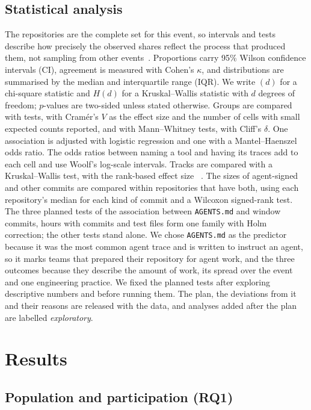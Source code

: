 \documentclass{article}
\begin{document}
\subsection{Statistical analysis}
The repositories are the complete set for this event, so intervals and tests describe how precisely the observed shares reflect the process that produced them, not sampling from other events~\cite{baltes2022sampling}. Proportions carry 95\% Wilson confidence intervals (CI), agreement is measured with Cohen's $\kappa$, and distributions are summarised by the median and interquartile range (IQR). We write \chisq$(d)$ for a chi-square statistic and $H(d)$ for a Kruskal--Wallis statistic with $d$ degrees of freedom; $p$-values are two-sided unless stated otherwise. Groups are compared with \chisq{} tests, with Cramér's $V$ as the effect size and the number of cells with small expected counts reported, and with Mann--Whitney tests, with Cliff's $\delta$. One association is adjusted with logistic regression and one with a Mantel--Haenszel odds ratio. The odds ratios between naming a tool and having its traces add \haldane{} to each cell and use Woolf's log-scale intervals. Tracks are compared with a Kruskal--Wallis test, with the rank-based effect size \epsqformula{}~\cite{tomczak2014effectsize}. The sizes of agent-signed and other commits are compared within repositories that have both, using each repository's median for each kind of commit and a Wilcoxon signed-rank test. The three planned tests of the association between \texttt{AGENTS.md} and window commits, hours with commits and test files form one family with Holm correction; the other tests stand alone. We chose \texttt{AGENTS.md} as the predictor because it was the most common agent trace and is written to instruct an agent, so it marks teams that prepared their repository for agent work, and the three outcomes because they describe the amount of work, its spread over the event and one engineering practice. We fixed the planned tests after exploring descriptive numbers and before running them. The plan, the deviations from it and their reasons are released with the data, and analyses added after the plan are labelled \emph{exploratory}.

\section{Results}\label{sec:results}

\subsection{Population and participation (RQ1)}\label{sec:population}
\end{document}

